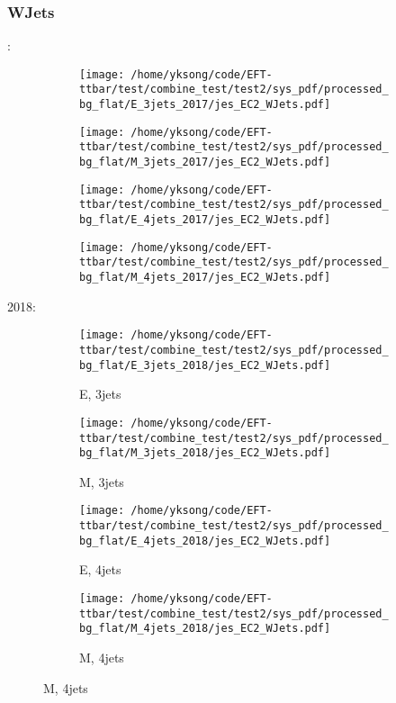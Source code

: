 \documentclass{beamer}
\begin{document}
\begin{frame}
\frametitle{WJets}
\fontsize{5}{1}:
\begin{figure}
\centering
\begin{subfigure}[b]{0.24\textwidth}
\texttt{[image: /home/yksong/code/EFT-ttbar/test/combine\_test/test2/sys\_pdf/processed\_bg\_flat/E\_3jets\_2017/jes\_EC2\_WJets.pdf]}
\end{subfigure}
\begin{subfigure}[b]{0.24\textwidth}
\texttt{[image: /home/yksong/code/EFT-ttbar/test/combine\_test/test2/sys\_pdf/processed\_bg\_flat/M\_3jets\_2017/jes\_EC2\_WJets.pdf]}
\end{subfigure}
\begin{subfigure}[b]{0.24\textwidth}
\texttt{[image: /home/yksong/code/EFT-ttbar/test/combine\_test/test2/sys\_pdf/processed\_bg\_flat/E\_4jets\_2017/jes\_EC2\_WJets.pdf]}
\end{subfigure}
\begin{subfigure}[b]{0.24\textwidth}
\texttt{[image: /home/yksong/code/EFT-ttbar/test/combine\_test/test2/sys\_pdf/processed\_bg\_flat/M\_4jets\_2017/jes\_EC2\_WJets.pdf]}
\end{subfigure}
\end{figure}
2018:
\begin{figure}
\centering
\begin{subfigure}[b]{0.24\textwidth}
\texttt{[image: /home/yksong/code/EFT-ttbar/test/combine\_test/test2/sys\_pdf/processed\_bg\_flat/E\_3jets\_2018/jes\_EC2\_WJets.pdf]}
\captionsetup{font=tiny}
\caption{E, 3jets}
\end{subfigure}
\begin{subfigure}[b]{0.24\textwidth}
\texttt{[image: /home/yksong/code/EFT-ttbar/test/combine\_test/test2/sys\_pdf/processed\_bg\_flat/M\_3jets\_2018/jes\_EC2\_WJets.pdf]}
\captionsetup{font=tiny}
\caption{M, 3jets}
\end{subfigure}
\begin{subfigure}[b]{0.24\textwidth}
\texttt{[image: /home/yksong/code/EFT-ttbar/test/combine\_test/test2/sys\_pdf/processed\_bg\_flat/E\_4jets\_2018/jes\_EC2\_WJets.pdf]}
\captionsetup{font=tiny}
\caption{E, 4jets}
\end{subfigure}
\begin{subfigure}[b]{0.24\textwidth}
\texttt{[image: /home/yksong/code/EFT-ttbar/test/combine\_test/test2/sys\_pdf/processed\_bg\_flat/M\_4jets\_2018/jes\_EC2\_WJets.pdf]}
\captionsetup{font=tiny}
\caption{M, 4jets}
\end{subfigure}
\end{figure}
\end{frame}
\end{document}

